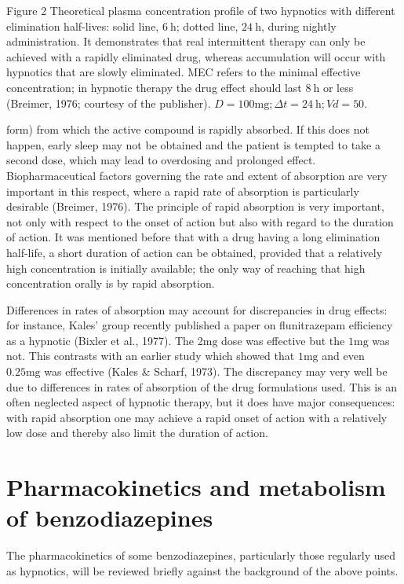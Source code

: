 \documentclass[10pt]{article}
\begin{document}
Figure 2 Theoretical plasma concentration profile of two hypnotics with different elimination half-lives: solid line, $6 \mathrm{~h}$; dotted line, $24 \mathrm{~h}$, during nightly administration. It demonstrates that real intermittent therapy can only be achieved with a rapidly eliminated drug, whereas accumulation will occur with hypnotics that are slowly eliminated. MEC refers to the minimal effective concentration; in hypnotic therapy the drug effect should last $8 \mathrm{~h}$ or less (Breimer, 1976; courtesy of the publisher). $D=100 \mathrm{mg} ; \Delta t=24 \mathrm{~h} ; V d=50$.

form) from which the active compound is rapidly absorbed. If this does not happen, early sleep may not be obtained and the patient is tempted to take a second dose, which may lead to overdosing and prolonged effect. Biopharmaceutical factors governing the rate and extent of absorption are very important in this respect, where a rapid rate of absorption is particularly desirable (Breimer, 1976). The principle of rapid absorption is very important, not only with respect to the onset of action but also with regard to the duration of action. It was mentioned before that with a drug having a long elimination half-life, a short duration of action can be obtained, provided that a relatively high concentration is initially available; the only way of reaching that high concentration orally is by rapid absorption.

Differences in rates of absorption may account for discrepancies in drug effects: for instance, Kales' group recently published a paper on flunitrazepam efficiency as a hypnotic (Bixler et al., 1977). The 2$\mathrm{mg}$ dose was effective but the $1 \mathrm{mg}$ was not. This contrasts with an earlier study which showed that $1 \mathrm{mg}$ and even $0.25 \mathrm{mg}$ was effective (Kales \& Scharf, 1973). The discrepancy may very well be due to differences in rates of absorption of the drug formulations used. This is an often neglected aspect of hypnotic therapy, but it does have major consequences: with rapid absorption one may achieve a rapid onset of action with a relatively low dose and thereby also limit the duration of action.

\section*{Pharmacokinetics and metabolism of benzodiazepines}
The pharmacokinetics of some benzodiazepines, particularly those regularly used as hypnotics, will be reviewed briefly against the background of the above points.
\end{document}
